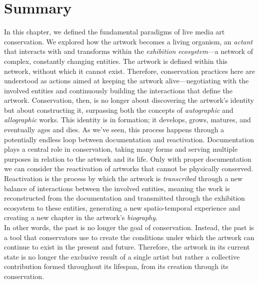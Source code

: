 \section{Summary}
In this chapter, we defined the fundamental paradigms of live media art conservation. We explored how the artwork becomes a living organism, an \textit{actant} that interacts with and transforms within the \textit{exhibition ecosystem}—a network of complex, constantly changing entities. The artwork is defined within this network, without which it cannot exist. Therefore, conservation practices here are understood as actions aimed at keeping the artwork alive—negotiating with the involved entities and continuously building the interactions that define the artwork. Conservation, then, is no longer about discovering the artwork’s identity but about constructing it, surpassing both the concepts of \textit{autographic} and \textit{allographic} works. This identity is in formation; it develops, grows, matures, and eventually ages and dies. As we’ve seen, this process happens through a potentially endless loop between documentation and reactivation. Documentation plays a central role in conservation, taking many forms and serving multiple purposes in relation to the artwork and its life. Only with proper documentation we can consider the reactivation of artworks that cannot be physically conserved. Reactivation is the process by which the artwork is \textit{transcribed} through a new balance of interactions between the involved entities, meaning the work is reconstructed from the documentation and transmitted through the exhibition ecosystem to these entities, generating a new spatio-temporal experience and creating a new chapter in the artwork’s \textit{biography}.\\
In other words, the past is no longer the goal of conservation. Instead, the past is a tool that conservators use to create the conditions under which the artwork can continue to exist in the present and future. Therefore, the artwork in its current state is no longer the exclusive result of a single artist but rather a collective contribution formed throughout its lifespan, from its creation through its conservation.